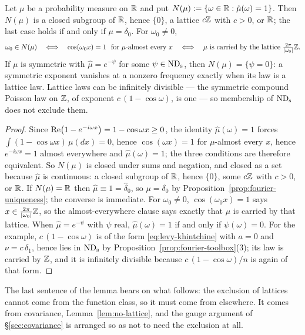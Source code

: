 \begin{lemma}\label{lem:lattice-zero}
Let $\mu$ be a probability measure on $\mathbb{R}$ and put
$N(\mu) := \{\omega \in \mathbb{R} : \hat\mu(\omega) = 1\}$. Then $N(\mu)$ is a closed subgroup of
$\mathbb{R}$, hence $\{0\}$, a lattice $c\mathbb{Z}$ with $c > 0$, or $\mathbb{R}$; the last case holds if and only
if $\mu = \delta_0$. For $\omega_0 \ne 0$,
\[
  \omega_0 \in N(\mu)
  \quad\Longleftrightarrow\quad
  \cos(\omega_0 x) = 1 \ \text{ for } \mu\text{-almost every } x
  \quad\Longleftrightarrow\quad
  \mu \text{ is carried by the lattice } \tfrac{2\pi}{|\omega_0|}\mathbb{Z} .
\]
If $\mu$ is symmetric with $\hat\mu = e^{-\psi}$ for some $\psi \in \mathrm{ND}_{\mathrm{s}}$, then
$N(\mu) = \{\psi = 0\}$: a symmetric exponent vanishes at a nonzero frequency exactly when its
law is a lattice law. Lattice laws can be infinitely divisible --- the symmetric compound
Poisson law on $\mathbb{Z}$, of exponent $c\,(1 - \cos\omega)$, is one --- so membership of $\mathrm{ND}_{\mathrm{s}}$
does not exclude them.
\end{lemma}

\begin{proof}
Since $\operatorname{Re}\bigl(1 - e^{-i\omega x}\bigr) = 1 - \cos\omega x \ge 0$, the identity
$\hat\mu(\omega) = 1$ forces $\int (1 - \cos\omega x)\,\mu(dx) = 0$, hence
$\cos(\omega x) = 1$ for $\mu$-almost every $x$, hence $e^{-i\omega x} = 1$ almost everywhere
and $\hat\mu(\omega) = 1$; the three conditions are therefore equivalent. So $N(\mu)$ is
closed under sums and negation, and closed as a set because $\hat\mu$ is continuous: a closed
subgroup of $\mathbb{R}$, hence $\{0\}$, some $c\mathbb{Z}$ with $c > 0$, or $\mathbb{R}$. If $N(\mu) = \mathbb{R}$ then
$\hat\mu \equiv 1 = \hat\delta_0$, so $\mu = \delta_0$ by
Proposition~\ref{prop:fourier-uniqueness}; the converse is immediate. For $\omega_0 \ne 0$,
$\cos(\omega_0 x) = 1$ says $x \in \tfrac{2\pi}{|\omega_0|}\mathbb{Z}$, so the almost-everywhere
clause says exactly that $\mu$ is carried by that lattice. When $\hat\mu = e^{-\psi}$ with
$\psi$ real, $\hat\mu(\omega) = 1$ if and only if $\psi(\omega) = 0$. For the example,
$c\,(1-\cos\omega)$ is of the form \ref{eq:levy-khintchine} with $a = 0$ and
$\nu = c\,\delta_1$, hence lies in $\mathrm{ND}_{\mathrm{s}}$ by Proposition~\ref{prop:fourier-toolbox}(3); its
law is carried by $\mathbb{Z}$, and it is infinitely divisible because $c\,(1-\cos\omega)/n$ is
again of that form.
\end{proof}

The last sentence of the lemma bears on what follows: the exclusion of lattices
cannot come from the function class, so it must come from elsewhere. It comes from
covariance, Lemma~\ref{lem:no-lattice}, and the gauge argument of \S\ref{sec:covariance} is
arranged so as not to need the exclusion at all.

